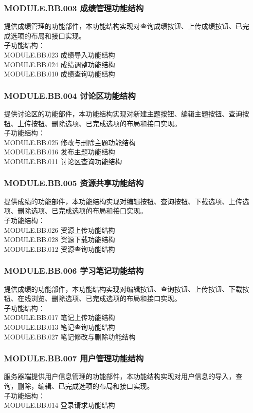 \subsubsection{MODULE.BB.003    成绩管理功能结构}
提供成绩管理的功能部件，本功能结构实现对查询成绩按钮、上传成绩按钮、已完成选项的布局和接口实现。
\\子功能结构：
\\MODULE.BB.023 成绩导入功能结构
\\MODULE.BB.024 成绩调整功能结构
\\MODULE.BB.010 成绩查询功能结构


\subsubsection{MODULE.BB.004    讨论区功能结构}
提供讨论区的功能部件，本功能结构实现对新建主题按钮、编辑主题按钮、查询按钮、上传按钮、删除选项、已完成选项的布局和接口实现。
\\子功能结构：
\\MODULE.BB.025 修改与删除主题功能结构
\\MODULE.BB.016 发布主题功能结构
\\MODULE.BB.011 讨论区查询功能结构

\subsubsection{MODULE.BB.005    资源共享功能结构}
提供成绩的功能部件，本功能结构实现对编辑按钮、查询按钮、下载选项、上传选项、删除选项、已完成选项的布局和接口实现。
\\子功能结构：
\\MODULE.BB.026 资源上传功能结构
\\MODULE.BB.028 资源下载功能结构
\\MODULE.BB.012 资源查询功能结构

\subsubsection{MODULE.BB.006    学习笔记功能结构}
提供成绩的功能部件，本功能结构实现对编辑按钮、查询按钮、上传按钮、下载按钮、在线浏览、删除选项、已完成选项的布局和接口实现。
\\子功能结构：
\\MODULE.BB.017 笔记上传功能结构
\\MODULE.BB.013 笔记查询功能结构
\\MODULE.BB.027 笔记修改与删除功能结构

\subsubsection{MODULE.BB.007    用户管理功能结构}
服务器端提供用户信息管理的功能部件，本功能结构实现对用户信息的导入，查询，删除，编辑、已完成选项的布局和接口实现。
\\子功能结构：
\\MODULE.BB.014 登录请求功能结构

